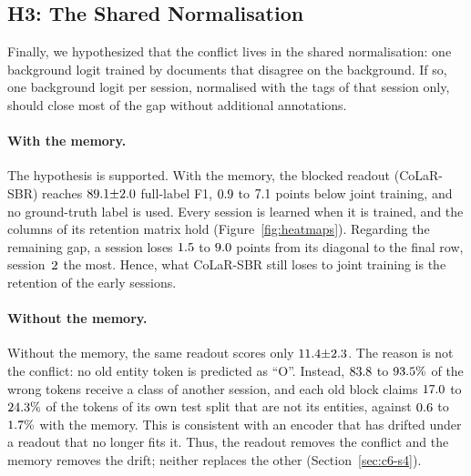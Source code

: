 \begin{table}[!htbp]
  \centering
  \caption[Three repairs on three class-incremental streams: values]{\textbf{Three repairs
  on three class-incremental streams} (full-label F1, mean $\pm$ s.d.). Every row but the
  last uses the same CoLaR memory, and the first three keep the shared softmax. The
  ground-truth stored labels are not available to a continual learner.}
  \label{tab:repairs}
  
\end{table}

\subsection{H3: The Shared Normalisation}
\label{sec:r-h3}

Finally, we hypothesized that the conflict lives in the shared normalisation: one
background logit trained by documents that disagree on the background. If so, one
background logit per session, normalised with the tags of that session only, should close
most of the gap without additional annotations.

\paragraph{With the memory.} The hypothesis is supported. With the memory, the blocked
readout (CoLaR-SBR) reaches $89.1{\pm}2.0$ full-label F1, $0.9$ to
$7.1$ points below joint training, and no ground-truth label is used. Every
session is learned when it is trained, and the columns of its retention matrix hold
(Figure~\ref{fig:heatmaps}). Regarding the remaining gap, a session loses $1.5$ to
$9.0$ points from its diagonal to the final row, session~$2$ the
most. Hence, what CoLaR-SBR still loses to joint training is the retention of the early
sessions.

\paragraph{Without the memory.} Without the memory, the same readout scores only
$11.4{\pm}2.3$. The reason is not the conflict: no old entity token is predicted as ``O''.
Instead, $83.8$ to $93.5\%$ of the wrong tokens receive a class of
another session, and each old block claims $17.0$ to $24.3\%$ of
the tokens of its own test split that are not its entities, against $0.6$ to
$1.7\%$ with the memory. This is consistent with an encoder that has drifted
under a readout that no longer fits it. Thus, the readout removes the conflict and the
memory removes the drift; neither replaces the other (Section~\ref{sec:c6-s4}).

